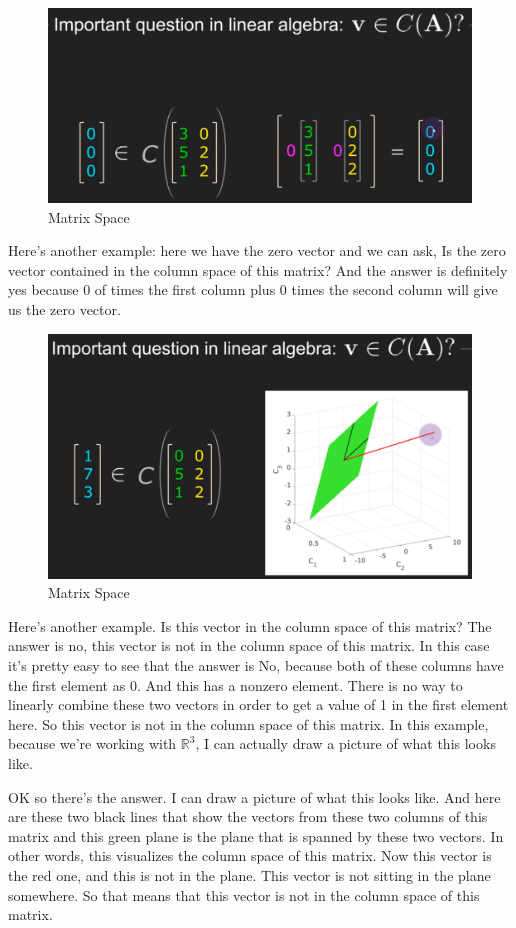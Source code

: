 \documentclass[fleqn,10pt]{olplainarticle}
\theoremstyle{definition}
\theoremstyle{remark}
\begin{document}
\begin{figure}[ht]
	\centering
	\includegraphics[width=0.5\linewidth]{images/matrix-space-04.png}
	\caption{Matrix Space}
	\label{fig:matrix_space_04}
\end{figure}

Here's another example: here we have the zero vector and we can ask, Is the zero vector contained in the column space of this matrix? And the answer is definitely yes because 0 of times the first column plus 0 times the second column will give us the zero vector.

\begin{figure}[ht]
	\centering
	\includegraphics[width=0.5\linewidth]{images/matrix-space-05.png}
	\caption{Matrix Space}
	\label{fig:matrix_space_05}
\end{figure}

Here's another example. Is this vector in the column space of this matrix? The answer is no, this vector is not in the column space of this matrix. In this case it's pretty easy to see that the answer is No, because both of these columns have the first element as 0. And this has a nonzero element. There is no way to linearly combine these two vectors in order to get a value of 1 in the first element here. So this vector is not in the column space of this matrix. In this example, because we're working with $\mathbb{R}^3$, I can actually draw a picture of what this looks like.

OK so there's the answer. I can draw a picture of what this looks like. And here are these two black lines that show the vectors from these two columns of this matrix and this green plane is the plane that is spanned by these two vectors. In other words, this visualizes the column space of this matrix. Now this vector is the red one, and this is not in the plane. This vector is not sitting in the plane somewhere. So that means that this vector is not in the column space of this matrix.
\end{document}
